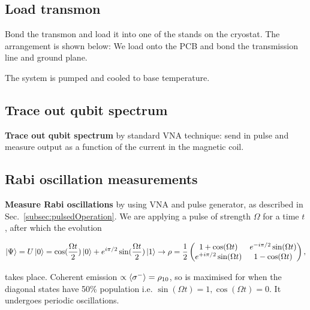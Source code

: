  \subsection{Load transmon}
  	 Bond the transmon and load it into one of the stands on the cryostat. The arrangement is shown below: We load onto the PCB and bond the transmission line and ground plane.
  	
  	
  	The system is pumped and cooled to base temperature.
  	
 \subsection{Trace out qubit spectrum} 
  \textbf{Trace out qubit spectrum} by standard VNA technique: send in pulse and measure output as a function of the current in the magnetic coil.
  	
  	
  	
 \subsection{Rabi oscillation measurements}
  	 \textbf{Measure Rabi oscillations} by using VNA and pulse generator, as described in Sec.~\ref{subsec:pulsedOperation}. We are applying a pulse of strength $ \Omega $ for a time $ t $, after which the evolution
  	 
  	 \[
  	 \ket{\Psi} = U\ket{0} = \cos(\frac{\Omega t}{2})\ket{0}+e^{i\pi/2}\sin(\frac{\Omega t}{2})\ket{1} \rightarrow 
  	 \rho = \frac{1}{2}\begin{pmatrix}
  	 1+\cos(\Omega t) & e^{-i\pi/2}\sin(\Omega t)\\ e^{+i\pi/2}\sin(\Omega t) & 1-\cos(\Omega t)
  	 \end{pmatrix},
  	 \]  
  	 
  	 \noindent takes place. \alert{Coherent emission $ \propto \left\langle \sigma^{-} \right\rangle = \rho_{10}$}, so is maximised for when the diagonal states have 50\% population i.e. $ \sin(\Omega t) = 1, \cos(\Omega t)=0 $. It undergoes periodic oscillations.
  	 

